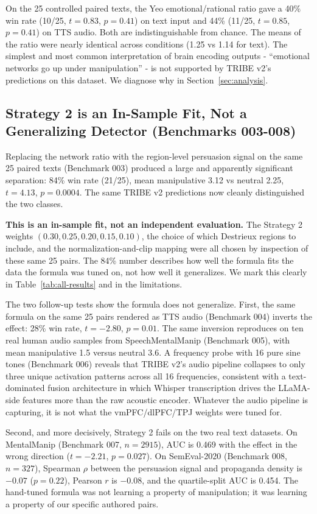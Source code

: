 \documentclass[11pt]{article}
\begin{document}
On the 25 controlled paired texts, the Yeo emotional/rational ratio gave a 40\% win rate (10/25, $t=0.83$, $p=0.41$) on text input and 44\% (11/25, $t=0.85$, $p=0.41$) on TTS audio. Both are indistinguishable from chance. The means of the ratio were nearly identical across conditions (1.25 vs 1.14 for text). The simplest and most common interpretation of brain encoding outputs - ``emotional networks go up under manipulation'' - is not supported by TRIBE v2's predictions on this dataset. We diagnose why in Section~\ref{sec:analysis}.

\subsection{Strategy 2 is an In-Sample Fit, Not a Generalizing Detector (Benchmarks 003-008)}
\label{sec:results-strat2}

Replacing the network ratio with the region-level persuasion signal on the same 25 paired texts (Benchmark 003) produced a large and apparently significant separation: 84\% win rate (21/25), mean manipulative 3.12 vs neutral 2.25, $t=4.13$, $p=0.0004$. The same TRIBE v2 predictions now cleanly distinguished the two classes.

\textbf{This is an in-sample fit, not an independent evaluation.} The Strategy 2 weights $(0.30, 0.25, 0.20, 0.15, 0.10)$, the choice of which Destrieux regions to include, and the normalization-and-clip mapping were all chosen by inspection of these same 25 pairs. The 84\% number describes how well the formula fits the data the formula was tuned on, not how well it generalizes. We mark this clearly in Table~\ref{tab:all-results} and in the limitations.

The two follow-up tests show the formula does not generalize. First, the same formula on the same 25 pairs rendered as TTS audio (Benchmark 004) inverts the effect: 28\% win rate, $t=-2.80$, $p=0.01$. The same inversion reproduces on ten real human audio samples from SpeechMentalManip (Benchmark 005), with mean manipulative 1.5 versus neutral 3.6. A frequency probe with 16 pure sine tones (Benchmark 006) reveals that TRIBE v2's audio pipeline collapses to only three unique activation patterns across all 16 frequencies, consistent with a text-dominated fusion architecture in which Whisper transcription drives the LLaMA-side features more than the raw acoustic encoder. Whatever the audio pipeline is capturing, it is not what the vmPFC/dlPFC/TPJ weights were tuned for.

Second, and more decisively, Strategy 2 fails on the two real text datasets. On MentalManip (Benchmark 007, $n=2915$), AUC is 0.469 with the effect in the wrong direction ($t=-2.21$, $p=0.027$). On SemEval-2020 (Benchmark 008, $n=327$), Spearman $\rho$ between the persuasion signal and propaganda density is $-0.07$ ($p=0.22$), Pearson $r$ is $-0.08$, and the quartile-split AUC is 0.454. The hand-tuned formula was not learning a property of manipulation; it was learning a property of our specific authored pairs.
\end{document}
